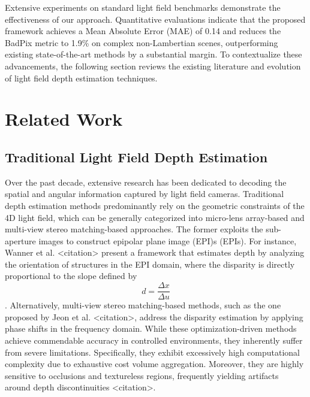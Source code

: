 \documentclass[lettersize,journal]{IEEEtran}
\begin{document}
Extensive experiments on standard light field benchmarks \cite{honauer2016} demonstrate the effectiveness of our approach. Quantitative evaluations indicate that the proposed framework achieves a Mean Absolute Error (MAE) of 0.14 and reduces the BadPix metric to 1.9\% on complex non-Lambertian scenes, outperforming existing state-of-the-art methods by a substantial margin. To contextualize these advancements, the following section reviews the existing literature and evolution of light field depth estimation techniques.

\section{Related Work}

\subsection{Traditional Light Field Depth Estimation}
Over the past decade, extensive research has been dedicated to decoding the spatial and angular information captured by light field cameras. Traditional depth estimation methods predominantly rely on the geometric constraints of the 4D light field, which can be generally categorized into micro-lens array-based and multi-view stereo matching-based approaches. The former exploits the sub-aperture images to construct epipolar plane image (EPI)s (EPIs). For instance, Wanner et al. <citation> present a framework that estimates depth by analyzing the orientation of structures in the EPI domain, where the disparity is directly proportional to the slope defined by $$d = \frac{\Delta x}{\Delta u}$$. Alternatively, multi-view stereo matching-based methods, such as the one proposed by Jeon et al. <citation>, address the disparity estimation by applying phase shifts in the frequency domain. While these optimization-driven methods achieve commendable accuracy in controlled environments, they inherently suffer from severe limitations. Specifically, they exhibit excessively high computational complexity due to exhaustive cost volume aggregation. Moreover, they are highly sensitive to occlusions and textureless regions, frequently yielding artifacts around depth discontinuities <citation>.
\end{document}
